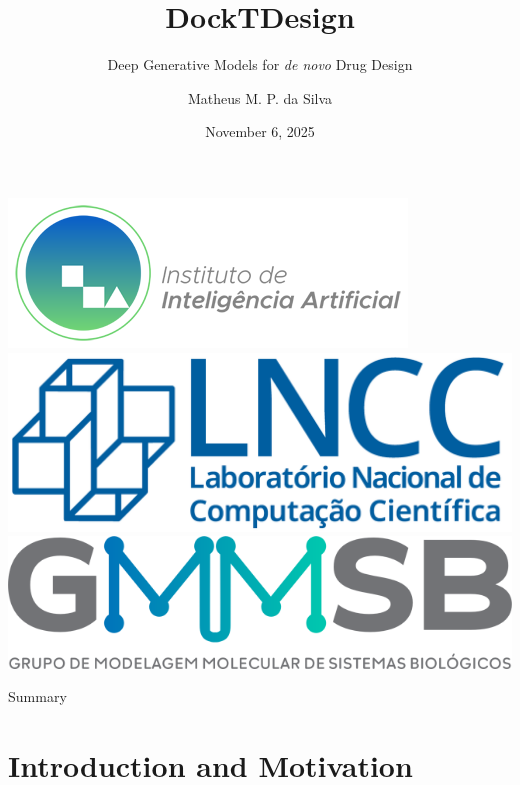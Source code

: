 \documentclass[aspectratio=169,xcolor=dvipsnames]{beamer}
\title{\textbf{DockTDesign}}
\subtitle{\Large Deep Generative Models for \textit{de novo} Drug Design}
\author{Matheus M. P. da Silva}
\institute
{
    PhD in Computational Modeling \\
    Laboratório Nacional de Computação Científica (LNCC/MCTI) \\
    \vspace{0.5em}
    {\faEnvelopeO} \texttt{matheusp@posgrad.lncc.br} \quad {\faGithub} \texttt{\href{https://github.com/mpds}{github.com/mpds}}
}
\date{November 6, 2025}
\begin{document}
\begin{frame}
    \begin{center}
        \includegraphics[height=1.cm]{imgs/logos/logo-instituto-ia.png}
        \hspace{1.cm}
        \includegraphics[height=1.cm]{imgs/logos/lncc-logo.png}
        \hspace{1.cm}
        \includegraphics[height=1.cm]{imgs/logos/gmmsb-logo.png}
    \end{center}
    \vspace{-5em}

    \titlepage
\end{frame}

\begin{frame}{Summary}

    \tableofcontents
\end{frame}





\section{Introduction and Motivation}
\end{document}
